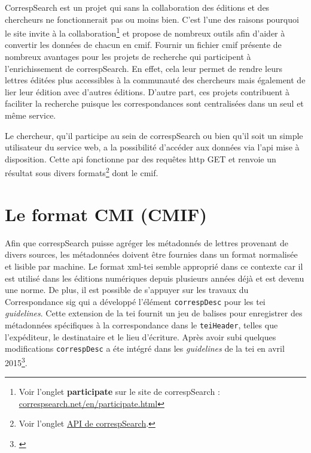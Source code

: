 \documentclass[a4paper, 12pt, twoside]{book}
\begin{document}
CorrespSearch est un projet qui sans la collaboration des éditions et des chercheurs ne fonctionnerait pas ou moins bien. C'est l'une des raisons pourquoi le site invite à la collaboration\footnote{Voir l'onglet \textbf{participate} sur le site de correspSearch : \href{https://correspsearch.net/en/participate.html}{correspsearch.net/en/participate.html}} et propose de nombreux outils afin d'aider à convertir les données de chacun en \gls{cmif}. Fournir un fichier \gls{cmif} présente de nombreux avantages pour les projets de recherche qui participent à l'enrichissement de correspSearch. En effet, cela leur permet de rendre leurs lettres éditées plus accessibles à la communauté des chercheurs mais également de lier leur édition avec d'autres éditions. D'autre part, ces projets contribuent à faciliter la recherche puisque les correspondances sont centralisées dans un seul et même service. 

Le chercheur, qu'il participe au sein de correspSearch ou bien qu'il soit un simple utilisateur du service web, a la possibilité d'accéder aux données via l'\gls{api} mise à disposition. Cette \gls{api} fonctionne par des requêtes \gls{http} GET et renvoie un résultat sous divers formats\footnote{Voir l'onglet \href{https://correspsearch.net/en/api.html}{API de correspSearch}.} dont le \gls{cmif}.

\section{Le format CMI (CMIF)}
Afin que correspSearch puisse agréger les métadonnés de lettres provenant de divers sources, les métadonnées doivent être fournies dans un format normalisée et lisible par machine. Le format \gls{xml}-\gls{tei} semble approprié dans ce contexte car il est utilisé dans les éditions numériques depuis plusieurs années déjà et est devenu une norme. De plus, il est possible de s'appuyer sur les travaux du Correspondance \gls{sig} qui a développé l'élément \texttt{correspDesc} pour les \gls{tei} \textit{guidelines}. Cette extension de la \gls{tei} fournit un jeu de balises pour enregistrer des métadonnées spécifiques à la correspondance dans le \texttt{teiHeader}, telles que l'expéditeur, le destinataire et le lieu d'écriture. Après avoir subi quelques modifications \texttt{correspDesc} a éte intégré dans les \textit{guidelines} de la \gls{tei} en avril 2015\footnote{\cite{dumont_correspsearch_2016}}.
\end{document}
